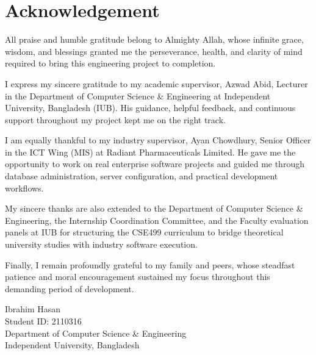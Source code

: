 \chapter*{Acknowledgement}

All praise and humble gratitude belong to Almighty Allah, whose infinite grace, wisdom, and blessings granted me the perseverance, health, and clarity of mind required to bring this engineering project to completion.

I express my sincere gratitude to my academic supervisor, Azwad Abid, Lecturer in the Department of Computer Science \& Engineering at Independent University, Bangladesh (IUB). His guidance, helpful feedback, and continuous support throughout my project kept me on the right track.

I am equally thankful to my industry supervisor, Ayan Chowdhury, Senior Officer in the ICT Wing (MIS) at Radiant Pharmaceuticals Limited. He gave me the opportunity to work on real enterprise software projects and guided me through database administration, server configuration, and practical development workflows.

My sincere thanks are also extended to the Department of Computer Science \& Engineering, the Internship Coordination Committee, and the Faculty evaluation panels at IUB for structuring the CSE499 curriculum to bridge theoretical university studies with industry software execution.
  
Finally, I remain profoundly grateful to my family and peers, whose steadfast patience and moral encouragement sustained my focus throughout this demanding period of development.

\vspace{1.5cm}

\noindent
Ibrahim Hasan\\
Student ID: 2110316\\
Department of Computer Science \& Engineering\\
Independent University, Bangladesh
